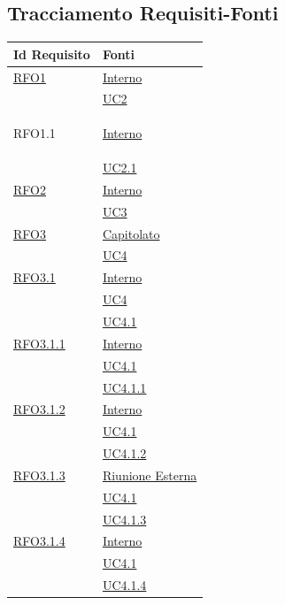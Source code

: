 \subsection{Tracciamento Requisiti-Fonti}
\normalsize
\begin{longtable}{|>{\centering}m{5cm}|m{5cm}<{\centering}|}
\hline
\textbf{Id Requisito} & \textbf{Fonti}\\
\hline
\endhead
\hyperlink{RFO1}{RFO1} & \hyperlink{Interno}{Interno}\\
& \hyperref[UC2]{UC2}\\ \hline

\hypertarget{RFO1.1}{RFO1.1} & \hyperlink{Interno}{Interno}\\
& \hyperref[UC2.1]{UC2.1}\\ \hline

\hyperlink{RFO2}{RFO2} & \hyperlink{Interno}{Interno}\\
& \hyperref[UC3]{UC3}\\ \hline

\hyperlink{RFO3}{RFO3} & \hyperlink{Capitolato}{Capitolato}\\
& \hyperref[UC4]{UC4}\\ \hline

\hyperlink{RFO3.1}{RFO3.1} & \hyperlink{Interno}{Interno}\\
& \hyperref[UC4]{UC4}\\
& \hyperref[UC4.1]{UC4.1}\\ \hline

\hyperlink{RFO3.1.1}{RFO3.1.1} & \hyperlink{Interno}{Interno}\\
& \hyperref[UC4.1]{UC4.1}\\
& \hyperref[UC4.1.1]{UC4.1.1}\\ \hline

\hyperlink{RFO3.1.2}{RFO3.1.2} & \hyperlink{Interno}{Interno}\\
& \hyperref[UC4.1]{UC4.1}\\
& \hyperref[UC4.1.2]{UC4.1.2}\\ \hline

\hyperlink{RFO3.1.3}{RFO3.1.3} & \hyperlink{Riunione Esterna}{Riunione Esterna}\\
& \hyperref[UC4.1]{UC4.1}\\
& \hyperref[UC4.1.3]{UC4.1.3}\\ \hline

\hyperlink{RFO3.1.4}{RFO3.1.4} & \hyperlink{Interno}{Interno}\\
& \hyperref[UC4.1]{UC4.1}\\
& \hyperref[UC4.1.4]{UC4.1.4}\\ \hline


\end{longtable}
